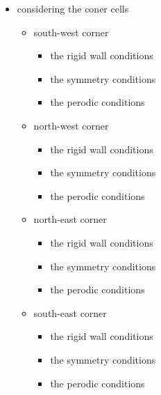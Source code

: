 \begin{itemize}
\item considering the coner cells

\begin{itemize}
\item south-west corner \begin{itemize}
\item the rigid wall conditions

\item the symmetry conditions

\item the perodic conditions \end{itemize}


\item north-west corner

\begin{itemize}
\item the rigid wall conditions

\item the symmetry conditions

\item the perodic conditions\end{itemize}


\item north-east corner

\begin{itemize}
\item the rigid wall conditions

\item the symmetry conditions

\item the perodic conditions\end{itemize}


\item south-east corner

\begin{itemize}
\item the rigid wall conditions

\item the symmetry conditions

\item the perodic conditions\end{itemize}
\end{itemize}
\end{itemize}


